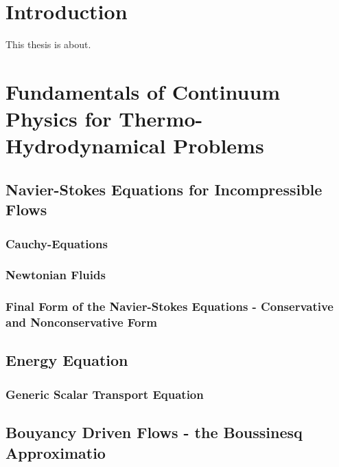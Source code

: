 \documentclass[article,type=msc,colorback,accentcolor=tud2a]{tudthesis}
\begin{document}
  \author{Fabian Nuraddin Alexander Gabel}
  \makethesistitle
  \tableofcontents

\printnomenclature
  \section{Introduction}

  This thesis is about. 

  \section{Fundamentals of Continuum Physics for Thermo-Hydrodynamical Problems}

    \subsection{Navier-Stokes Equations for Incompressible Flows}

      \subsubsection{Cauchy-Equations}
      \subsubsection{Newtonian Fluids}
      \subsubsection{Final Form of the Navier-Stokes Equations - Conservative and Nonconservative Form}

    \subsection{Energy Equation}

      \subsubsection{Generic Scalar Transport Equation}

    \subsection{Bouyancy Driven Flows - the Boussinesq Approximatio}
      
\end{document}

